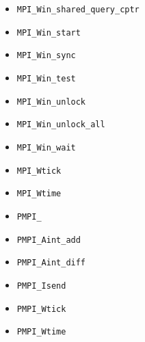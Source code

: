 \begin{multicols}{3}
\begin{itemize}
\item \texttt{MPI_Win_shared_query_cptr}~\pageref{def:MPI_Win_shared_query_cptr}
\item \texttt{MPI_Win_start}~\pageref{def:MPI_Win_start}
\item \texttt{MPI_Win_sync}~\pageref{def:MPI_Win_sync}
\item \texttt{MPI_Win_test}~\pageref{def:MPI_Win_test}
\item \texttt{MPI_Win_unlock}~\pageref{def:MPI_Win_unlock}
\item \texttt{MPI_Win_unlock_all}~\pageref{def:MPI_Win_unlock_all}
\item \texttt{MPI_Win_wait}~\pageref{def:MPI_Win_wait}
\item \texttt{MPI_Wtick}~\pageref{def:MPI_Wtick}
\item \texttt{MPI_Wtime}~\pageref{def:MPI_Wtime}
\item \texttt{PMPI_}~\pageref{def:PMPI_}
\item \texttt{PMPI_Aint_add}~\pageref{def:PMPI_Aint_add}
\item \texttt{PMPI_Aint_diff}~\pageref{def:PMPI_Aint_diff}
\item \texttt{PMPI_Isend}~\pageref{def:PMPI_Isend}
\item \texttt{PMPI_Wtick}~\pageref{def:PMPI_Wtick}
\item \texttt{PMPI_Wtime}~\pageref{def:PMPI_Wtime}
\end{itemize}
\end{multicols}
